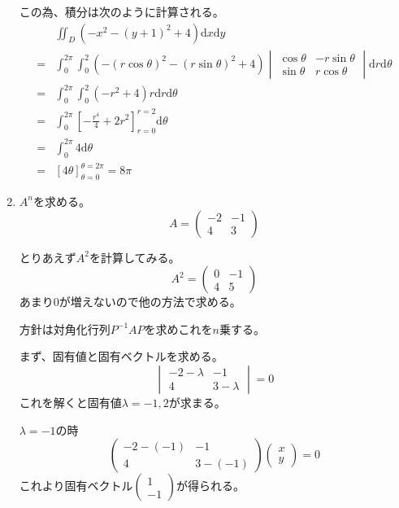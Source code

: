 \documentclass[12pt,b5paper]{ltjsarticle}
\begin{document}
\begin{enumerate}
      この為、積分は次のように計算される。
      \begin{align}
       & \iint_{D} (-x^2-(y+1)^2+4)\mathrm{d}x\mathrm{d}y\\
       =& \int_{0}^{2\pi}\!\!\!\!\int_{0}^{2}
       (-(r\cos\theta)^2-(r\sin\theta)^2+4)
          \begin{vmatrix}
           \cos\theta & -r\sin\theta\\
           \sin\theta & r\cos\theta
          \end{vmatrix}
       \mathrm{d}r\mathrm{d}\theta\\
       =& \int_{0}^{2\pi}\!\!\!\!\int_{0}^{2}(-r^2+4)r\mathrm{d}r\mathrm{d}\theta\\
       =& \int_{0}^{2\pi}\left[-\frac{r^4}{4}+2r^2\right]_{r=0}^{r=2}\mathrm{d}\theta\\
       =& \int_{0}^{2\pi}4\mathrm{d}\theta\\
       =& [4\theta]_{\theta=0}^{\theta=2\pi}=8\pi
      \end{align}

 \item
      $A^n$を求める。
       \begin{equation}
        A=\begin{pmatrix} -2 & -1 \\ 4 & 3 \end{pmatrix}
       \end{equation}

      とりあえず$A^2$を計算してみる。
       \begin{equation}
        A^2=\begin{pmatrix} 0 & -1 \\ 4 & 5 \end{pmatrix}
       \end{equation}
      あまり0が増えないので他の方法で求める。

      方針は対角化行列$P^{-1}AP$を求めこれを$n$乗する。

      まず、固有値と固有ベクトルを求める。
      \begin{equation}
       \begin{vmatrix}-2-\lambda & -1\\ 4 & 3-\lambda\end{vmatrix}=0
      \end{equation}
      これを解くと固有値$\lambda=-1,2$が求まる。

      $\lambda=-1$の時
      \begin{equation}
       \begin{pmatrix}-2-(-1) & -1\\ 4 & 3-(-1)\end{pmatrix}
       \begin{pmatrix}x\\y\end{pmatrix}
       =0
      \end{equation}
      これより固有ベクトル$\begin{pmatrix}1\\-1\end{pmatrix}$が得られる。


\end{enumerate}
\end{document}
